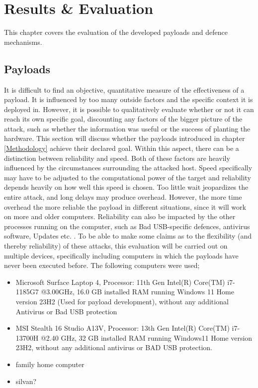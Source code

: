 \chapter{Results \& Evaluation} \label{Evaluation}

This chapter covers the evaluation of the developed payloads and defence mechanisms. 


\section{Payloads}

It is difficult to find an objective, quantitative measure of the effectiveness of a payload. It is influenced by too many outside factors and the specific context it is deployed in. However, it is possible to qualitatively evaluate whether or not it can reach its own specific goal, discounting any factors of the bigger picture of the attack, such as whether the information was useful or the success of planting the hardware. This section will discuss whether the payloads introduced in chapter \ref{Methodology} achieve their declared goal. Within this aspect, there can be a distinction between reliability and speed. Both of these factors are heavily influenced by the circumstances surrounding the attacked host. Speed specifically may have to be adjusted to the computational power of the target and reliability depends heavily on how well this speed is chosen. Too little wait jeopardizes the entire attack, and long delays may produce overhead. However, the more time overhead the more reliable the payload in different situations, since it will work on more and older computers. Reliability can also be impacted by the other processes running on the computer, such as Bad USB-specific defences, antivirus software, Updates etc. . To be able to make some claims as to the flexibility (and thereby reliability) of these attacks, this evaluation will be carried out on multiple devices, specifically including computers in which the payloads have never been executed before. The following computers were used;

\begin{itemize}
    \item Microsoft Surface Laptop 4, Processor: 11th Gen Intel(R) Core(TM) i7-1185G7 @3.00GHz, 16.0 GB installed RAM running Windows 11 Home version 23H2 (Used for payload development), without any additional Antivirus or Bad USB protection
    \item MSI Stealth 16 Studio A13V, Processor: 13th Gen Intel(R) Core(TM) i7-13700H @2.40 GHz, 32 GB installed RAM running Windows11 Home version 23H2, without any additional antivirus or BAD USB protection.
    \item family home computer
    \item silvan?
\end{itemize}
    
